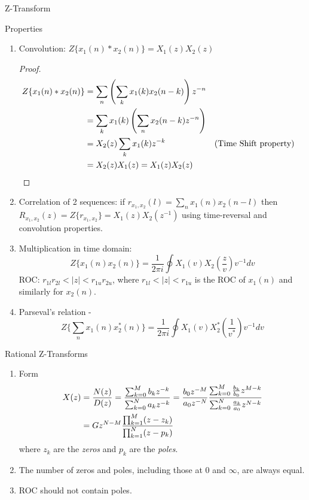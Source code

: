 \documentclass{article}
\begin{document}
\begin{section}{Z-Transform}
\begin{subsection}{Properties}
\begin{enumerate}
\begin{proof}
  \end{proof}
\item Convolution: $Z\{x_{1}(n) * x_{2}(n)\} = X_{1}(z)X_{2}(z)$
  \begin{proof}
  \begin{align}
  Z\{x_{1}(n) * x_{2}(n)\} &= \sum_{n} \left(\sum_{k} x_{1}(k) x_{2}(n-k)\right)
     z^{-n} \notag\\
     &= \sum_{k} x_{1}(k) \left(\sum_{n} x_{2}(n-k) z^{-n}\right)\notag\\
     &= X_{2}(z) \sum_{k} x_{1}(k) z^{-k} && \text{(Time Shift property)}
    \notag\\
     &= X_{2}(z) X_{1}(z) = X_{1}(z) X_{2}(z)\notag
  \end{align}
  \end{proof}
\item Correlation of 2 sequences: if $r_{x_{1},x_{2}}(l) = 
  \sum_{n} x_{1}(n) x_{2}(n-l)$ then $R_{x_{1},x_{2}}(z) = 
  Z\{r_{x_{1},x_{2}}\} = X_{1}(z) X_{2}(z^{-1})$ using time-reversal and
  convolution properties.
\item Multiplication in time domain:
  \[ Z\{x_{1}(n) x_{2}(n) \} = \frac{1}{2 \pi i} \oint X_{1}(v) 
      X_{2}(\frac{z}{v}) v^{-1} dv \]
  \noindent ROC: $r_{1l} r_{2l} < |z| < r_{1u} r_{2u}$, where $r_{1l} < |z| <
  r_{1u}$ is the ROC of $x_{1}(n)$ and similarly for $x_{2}(n)$.
\item Parseval's relation - 
  \[ Z\{\sum_{n} x_{1}(n) x_{2}^{*}(n) \} = \frac{1}{2 \pi i} \oint X_{1}(v) 
      X_{2}^{*}(\frac{1}{v^{*}}) v^{-1} dv \]

\end{enumerate}
\end{subsection}
\end{section}

\begin{section}{Rational Z-Transforms}
\begin{enumerate}
\item Form
  \begin{align}
  X(z) &= \frac{N(z)}{D(z)} = \frac{\sum_{k=0}^{M} b_k z^{-k} }
                                   {\sum_{k=0}^{N} a_k z^{-k} }
        = \frac{b_{0}z^{-M}}{a_{0} z^{-N}}
          \frac{\sum_{k=0}^M \frac{b_{k}}{b_{0}} z^{M-k}}
               {\sum_{k=0}^N \frac{a_{k}}{a_{0}} z^{N-k}} \notag\\
       &= G z^{N-M} \frac{\prod_{k=1}^M (z - z_{k})}
                         {\prod_{k=1}^N (z - p_{k})}\notag
  \end{align}
  \noindent where $z_{k}$ are the \emph{zeros} and $p_k$ are the \emph{poles}.
\item The number of zeros and poles, including those at 0 and $\infty$, are
  always equal. 
\item ROC should not contain poles.
\end{enumerate}
\end{section}
\end{document}
